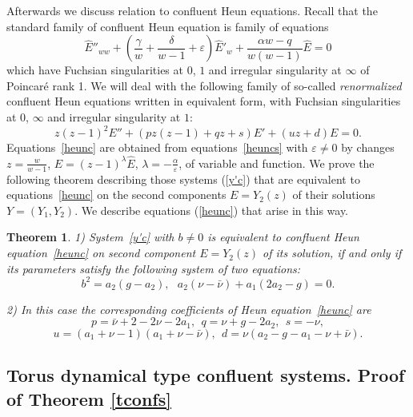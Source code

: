 \documentclass[preprint,12pt]{elsarticle}
\theoremstyle{plain}
\newtheorem{theorem}{Theorem}
\def\a{\alpha}
\numberwithin{equation}{section}
\numberwithin{equation}{section}
\begin{document}
Afterwards we discuss relation to confluent Heun equations. Recall that the 
standard family of confluent Heun equation is family of equations 
\begin{equation}\widehat E''_{ww}+\left(\frac\gamma{w}+\frac\delta{w-1}+\varepsilon\right)\widehat E'_w+\frac{\a w-q}{w(w-1)}\widehat E=0\label{heuncs}\end{equation}
which have Fuchsian singularities at $0$, $1$ and irregular singularity at $\infty$ of Poincar\'e rank 1.  We 
will deal with the following family of so-called {\it renormalized} 
 confluent Heun equations written in equivalent form, with 
Fuchsian singularities at $0$, $\infty$ and irregular singularity at $1$:
\begin{equation}z(z-1)^2E''+(pz(z-1)+qz+s)E'+(uz+d)E=0.\label{heunc}\end{equation}
Equations~\eqref{heunc} are obtained from equations~\eqref{heuncs} with $\varepsilon\neq0$ by changes $z=\frac w{w-1}$, $E=(z-1)^\lambda\widehat{E}$, $\lambda=-\frac{\alpha}{\varepsilon}$,  of variable and function. We prove the following theorem describing those systems (\ref{y'c}) that are equivalent to equations~\eqref{heunc} on the second components $E=Y_2(z)$ of their solutions $Y=(Y_1,Y_2)$. We describe equations (\ref{heunc}) that arise in this way.
\begin{theorem} \label{thc} 1) System~\eqref{y'c} with $b\neq0$ is equivalent to confluent Heun equation~\eqref{heunc} on 
 second component $E=Y_2(z)$ of its solution, if and only if its parameters satisfy the following system of 
 two equations:
 \begin{equation} b^2=a_2(g-a_2), \ \ \ a_2(\nu-\bar\nu)+a_1(2a_2-g)=0.\label{ech}\end{equation}
 
 2) In this case the corresponding coefficients of Heun equation~\eqref{heunc} are 
$$p=\bar\nu+2-2\nu-2a_1, \ \ q=\nu+g-2a_2, \ \ s=-\nu,$$
 \begin{equation} u=(a_1+\nu-1)(a_1+\nu-\bar\nu), \ \ d=\nu(a_2-g-a_1-\nu+\bar\nu).\label{coefl}
 \end{equation}
 \end{theorem}
 
 

\subsection{Torus dynamical type confluent systems. Proof of Theorem \ref{tconfs}}
\end{document}
